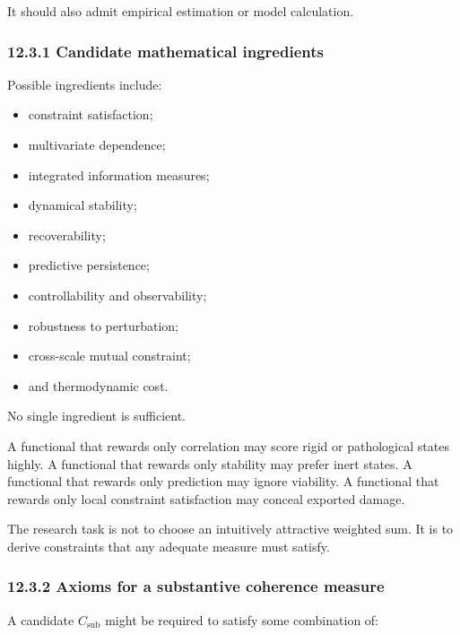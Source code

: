 \documentclass[
  11pt,
]{article}
\providecommand{\tightlist}{%
  \setlength{\itemsep}{0pt}\setlength{\parskip}{0pt}}
\begin{document}
It should also admit empirical estimation or model calculation.

\subsubsection{12.3.1 Candidate mathematical
ingredients}\label{candidate-mathematical-ingredients}

Possible ingredients include:

\begin{itemize}
\tightlist
\item
  constraint satisfaction;
\item
  multivariate dependence;
\item
  integrated information measures;
\item
  dynamical stability;
\item
  recoverability;
\item
  predictive persistence;
\item
  controllability and observability;
\item
  robustness to perturbation;
\item
  cross-scale mutual constraint;
\item
  and thermodynamic cost.
\end{itemize}

No single ingredient is sufficient.

A functional that rewards only correlation may score rigid or
pathological states highly. A functional that rewards only stability may
prefer inert states. A functional that rewards only prediction may
ignore viability. A functional that rewards only local constraint
satisfaction may conceal exported damage.

The research task is not to choose an intuitively attractive weighted
sum. It is to derive constraints that any adequate measure must satisfy.

\subsubsection{12.3.2 Axioms for a substantive coherence
measure}\label{axioms-for-a-substantive-coherence-measure}

A candidate \(C_{\mathrm{sub}}\) might be required to satisfy some
combination of:
\end{document}
